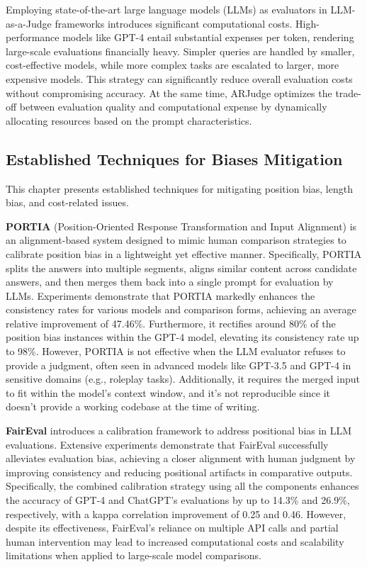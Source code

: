 \documentclass[sigconf, authoryear]{acmart}
\begin{document}
Employing state-of-the-art large language models (LLMs) as evaluators in LLM-as-a-Judge frameworks introduces significant computational costs.
High-performance models like GPT-4 entail substantial expenses per token, rendering large-scale evaluations financially heavy.
Simpler queries are handled by smaller, cost-effective models, while more complex tasks are escalated to larger, more expensive models.
This strategy can significantly reduce overall evaluation costs without compromising accuracy\cite{chen2023frugalgpt}.
At the same time, ARJudge optimizes the trade-off between evaluation quality and computational expense by dynamically allocating resources based on the prompt characteristics\cite{ar_judge}.

\subsection{Established Techniques for Biases Mitigation}\label{subsec:established-techniques-for-bias-mitigation}

This chapter presents established techniques for mitigating position bias, length bias, and cost-related issues.

\textbf{PORTIA} (Position-Oriented Response Transformation and Input Alignment) is an alignment-based system designed to mimic human comparison strategies to calibrate position bias in a lightweight yet effective manner.
Specifically, PORTIA splits the answers into multiple segments, aligns similar content across candidate answers, and then merges them back into a single prompt for evaluation by LLMs.
Experiments demonstrate that PORTIA markedly enhances the consistency rates for various models and comparison forms, achieving an average relative improvement of 47.46\%.
Furthermore, it rectifies around 80\% of the position bias instances within the GPT-4 model, elevating its consistency rate up to 98\%.
However, PORTIA is not effective when the LLM evaluator refuses to provide a judgment, often seen in advanced models like GPT-3.5 and GPT-4 in sensitive domains (e.g., roleplay tasks).
Additionally, it requires the merged input to fit within the model’s context window, and it's not reproducible since it doesn't provide a working codebase at the time of writing\cite{portia}.

\textbf{FairEval} introduces a calibration framework to address positional bias in LLM evaluations.
Extensive experiments demonstrate that FairEval successfully alleviates evaluation bias, achieving a closer alignment with human judgment by improving consistency and reducing positional artifacts in comparative outputs.
Specifically, the combined calibration strategy using all the components enhances the accuracy of GPT-4 and ChatGPT’s evaluations by up to 14.3\% and 26.9\%, respectively, with a kappa correlation improvement of 0.25 and 0.46.
However, despite its effectiveness, FairEval's reliance on multiple API calls and partial human intervention may lead to increased computational costs and scalability limitations when applied to large-scale model comparisons\cite{faireval}.
\end{document}
